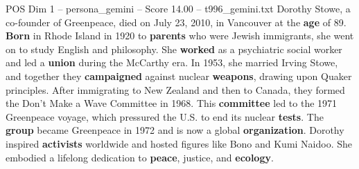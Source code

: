 \begin{textsample}{POS Dim 1 – persona\_gemini – Score 14.00 – t996\_gemini.txt}  \label{ex:f1_pos_043}
Dorothy Stowe, a co-founder of Greenpeace, died on July 23, 2010, in Vancouver at the \textbf{age} of 89. \textbf{Born} in Rhode Island in 1920 to \textbf{parents} who were Jewish immigrants, she went on to study English and philosophy.
She \textbf{worked} as a psychiatric social worker and led a \textbf{union} during the McCarthy era.
In 1953, she married Irving Stowe, and together they \textbf{campaigned} against nuclear \textbf{weapons}, drawing upon Quaker principles.
After immigrating to New Zealand and then to Canada, they formed the Don't Make a Wave Committee in 1968.
This \textbf{committee} led to the 1971 Greenpeace voyage, which pressured the U.S. to end its nuclear \textbf{tests}.
The \textbf{group} became Greenpeace in 1972 and is now a global \textbf{organization}.
Dorothy inspired \textbf{activists} worldwide and hosted figures like Bono and Kumi Naidoo.
She embodied a lifelong dedication to \textbf{peace}, justice, and \textbf{ecology}.

\end{textsample}
